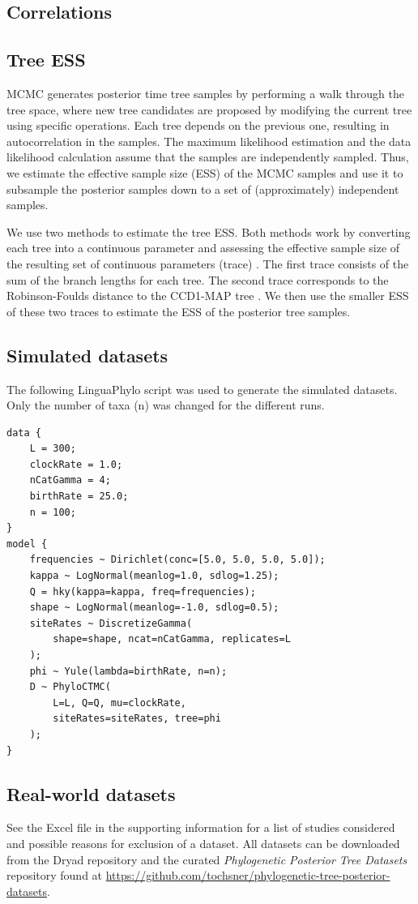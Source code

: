 \documentclass[10pt,letterpaper]{article}
\begin{document}
\subsection*{Correlations}

\subsection*{Tree ESS}

MCMC generates posterior time tree samples by performing a walk through the tree space, where new tree candidates are proposed by modifying the current tree using specific operations. Each tree depends on the previous one, resulting in autocorrelation in the samples. The maximum likelihood estimation and the data likelihood calculation assume that the samples are independently sampled. Thus, we estimate the effective sample size (ESS) of the MCMC samples and use it to subsample the posterior samples down to a set of (approximately) independent samples.

We use two methods to estimate the tree ESS. Both methods work by converting each tree into a continuous parameter and assessing the effective sample size of the resulting set of continuous parameters (trace) \cite{treeess,vehtari2021rank}. The first trace consists of the sum of the branch lengths for each tree. The second trace corresponds to the Robinson-Foulds distance to the CCD1-MAP tree \cite{ccd}. We then use the smaller ESS of these two traces to estimate the ESS of the posterior tree samples.

\subsection*{Simulated datasets}

The following LinguaPhylo script was used to generate the simulated datasets. Only the number of taxa (n) was changed for the different runs.

\begin{lstlisting}[basicstyle=\small]
data {
	L = 300;
	clockRate = 1.0;
	nCatGamma = 4;
	birthRate = 25.0;
	n = 100;
}
model {
	frequencies ~ Dirichlet(conc=[5.0, 5.0, 5.0, 5.0]);
	kappa ~ LogNormal(meanlog=1.0, sdlog=1.25);
	Q = hky(kappa=kappa, freq=frequencies);
	shape ~ LogNormal(meanlog=-1.0, sdlog=0.5);
	siteRates ~ DiscretizeGamma(
		shape=shape, ncat=nCatGamma, replicates=L
	);
	phi ~ Yule(lambda=birthRate, n=n);
	D ~ PhyloCTMC(
		L=L, Q=Q, mu=clockRate,
		siteRates=siteRates, tree=phi
	);
}
\end{lstlisting}

\subsection*{Real-world datasets}

See the Excel file in the supporting information for a list of studies considered and possible reasons for exclusion of a dataset. All datasets can be downloaded from the Dryad repository \cite{dryad} and the curated \emph{Phylogenetic Posterior Tree Datasets} repository \cite{tree_dataset} found at \url{https://github.com/tochsner/phylogenetic-tree-posterior-datasets}.

\nolinenumbers


\end{document}
